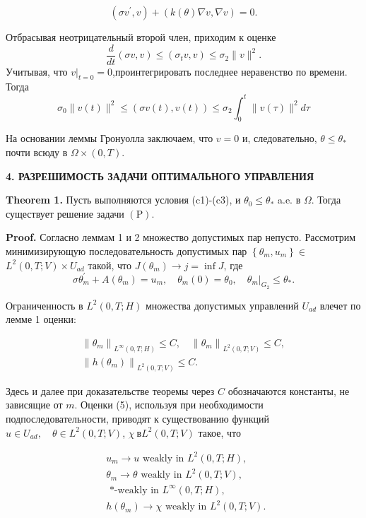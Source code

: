 \[
\left(\sigma v^{\prime}, v\right)+(k(\theta) \nabla v, \nabla v)=0 .
\]

Отбрасывая неотрицательный второй член, приходим к оценке
\[
\frac{d}{d t}(\sigma v, v) \leq\left(\sigma_{t} v, v\right) \leq \sigma_{2}\|v\|^{2} .
\]
Учитывая, что $\left.v\right|_{t=0}=0$,проинтегрировать последнее неравенство по времени.
Тогда
\[
\sigma_{0}\|v(t)\|^{2} \leq(\sigma v(t), v(t)) \leq \sigma_{2} \int_{0}^{t}\|v(\tau)\|^{2} d \tau
\]

На основании леммы Гронуолла заключаем,
что $v=0$ и, следовательно, $\theta \leq \theta_{*}$ почти всюду в $\Omega\times(0,T)$.

\textbf{4. РАЗРЕШИМОСТЬ ЗАДАЧИ ОПТИМАЛЬНОГО УПРАВЛЕНИЯ}

\textbf{Theorem 1.}
Пусть выполняются условия (c1)-(c3), и $\theta_{0} \leq \theta_{*}$ a.e. в $\Omega$.
Тогда существует решение задачи $(\mathrm{P})$.

\textbf{Proof.}
Согласно леммам 1 и 2 множество допустимых пар непусто.
Рассмотрим минимизирующую последовательность допустимых
пар $\left\{\theta_{m}, u_{m}\right\} \in$ $L^{2}(0, T ; V) \times U_{a d}$
такой, что $J\left(\theta_{m}\right) \rightarrow j=\inf J$, где
\[
\sigma \theta_{m}^{\prime}+A\left(\theta_{m}\right)=u_{m},
\quad \theta_{m}(0)=\theta_{0},\left.\quad \theta_{m}\right|_{G_{2}} \leq \theta_{*} .
\]

Ограниченность в $L^{2}(0, T ; H)$ множества допустимых управлений $U_{a d}$ влечет по лемме 1 оценки:

\[
\begin{gathered}
\left\|\theta_{m}\right\|_{L^{\infty}(0, T ; H)} \leq C,
\quad\left\|\theta_{m}\right\|_{L^{2}(0, T ; V)} \leq C, \\
\left\|h\left(\theta_{m}\right)\right\|_{L^{2}(0, T ; V)} \leq C .
\end{gathered}
\]

Здесь и далее при доказательстве теоремы через $C$ обозначаются константы, не зависящие от $m$.
Оценки (5), используя при необходимости подпоследовательности,
приводят к существованию функций
$u \in U_{a d}, \quad \theta \in L^{2}(0, T ; V)$, $\chi \ в L^{2}(0, T ; V)$
такое, что

\[
\begin{aligned}
& u_{m} \rightarrow u \text { weakly in } L^{2}(0, T ; H), \\
& \theta_{m} \rightarrow \theta \text { weakly in } L^{2}(0, T ; V) \text {, } \\
& \text { *-weakly in } L^{\infty}(0, T ; H) \text {, } \\
& h\left(\theta_{m}\right) \rightarrow \chi \text { weakly in } L^{2}(0, T ; V) \text {. }
\end{aligned}
\]


